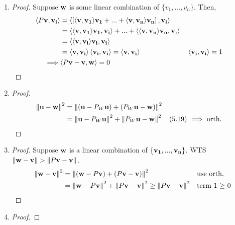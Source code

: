 \begin{enumerate}
    \item \begin{proof}
        Suppose $\vb{w}$ is some linear combination of $\{ v_1,...,v_n \}$. Then,
        \begin{align}
            \langle P\vb{v}, \vb{v_i} \rangle
            &= 
                \left\langle
                    \left[\langle \vb{v}, \vb{v_1} \rangle \vb{v_1} + ... + \langle \vb{v}, \vb{v_n} \rangle \vb{v_n}\right], \vb{v_i} 
                \right\rangle\\
            &= \left\langle \langle \vb{v}, \vb{v_1} \rangle \vb{v_1}, \vb{v_i} \right\rangle + ... + \left\langle \langle \vb{v}, \vb{v_n} \rangle \vb{v_n}, \vb{v_i} \right\rangle\\
            &= \left\langle \langle \vb{v}, \vb{v_i} \rangle \vb{v_i}, \vb{v_i} \right\rangle\\
            &= \langle \vb{v}, \vb{v_i} \rangle \left\langle \vb{v_i}, \vb{v_i} \right\rangle = \langle \vb{v}, \vb{v_i} \rangle && \left\langle \vb{v_i}, \vb{v_i} \right\rangle = 1\\
            \implies& \langle P\vb{v} - \vb{v}, \vb{w} \rangle = 0
        \end{align}
    \end{proof}
    \item \begin{proof}
        \begin{align}
            \norm{\vb{u} - \vb{w}}^2 &= \norm{(\vb{u} - P_W\vb{u}) + (P_W\vb{u} - \vb{w})}^2\\
            &= \norm{\vb{u} - P_W\vb{u}}^2 + \norm{P_W\vb{u} - \vb{w}}^2 && \text{(5.19) $\implies$ orth.}
        \end{align}
    \end{proof}
    \item \begin{proof}
        Suppose $\vb{w}$ is a linear combination of $\{ \vb{v_1},...,\vb{v_n} \}$. WTS $\norm{\vb{w} - \vb{v}} > \norm{P\vb{v} - \vb{v}}$.
        \begin{align}
            \norm{\vb{w}-\vb{v}}^2 &= \norm{(\vb{w}-P\vb{v}) + (P\vb{v} - \vb{v})}^2 && \text{use orth.}\\
            &= \norm{\vb{w}-P\vb{v}}^2 + \norm{P\vb{v} - \vb{v}}^2 \ge \norm{P\vb{v} - \vb{v}}^2 && \text{term 1 $\ge$ 0}
        \end{align}
    \end{proof}
    \item \begin{proof}

\end{proof}
\end{enumerate}

